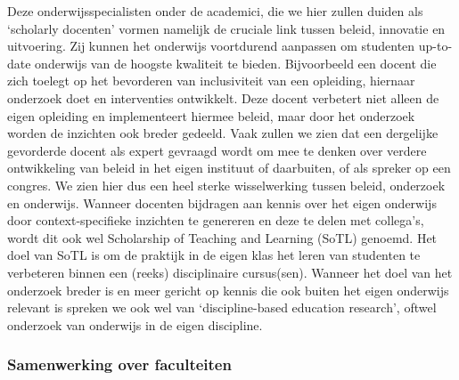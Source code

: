 \documentclass[empirical, authordate, ]{new-jote-article}
\begin{document}
	Deze onderwijsspecialisten onder de academici, die we hier zullen duiden als ‘scholarly docenten' vormen namelijk de cruciale link tussen beleid, innovatie en uitvoering. Zij kunnen het onderwijs voortdurend aanpassen om studenten up-to-date onderwijs van de hoogste kwaliteit te bieden. Bijvoorbeeld een docent die zich toelegt op het bevorderen van inclusiviteit van een opleiding, hiernaar onderzoek doet en interventies ontwikkelt. Deze docent verbetert niet alleen de eigen opleiding en implementeert hiermee beleid, maar door het onderzoek worden de inzichten ook breder gedeeld. Vaak zullen we zien dat een dergelijke gevorderde docent als expert gevraagd wordt om mee te denken over verdere ontwikkeling van beleid in het eigen instituut of daarbuiten, of als spreker op een congres. We zien hier dus een heel sterke wisselwerking tussen beleid, onderzoek en onderwijs. Wanneer docenten bijdragen aan kennis over het eigen onderwijs door context-specifieke inzichten te genereren en deze te delen met collega's, wordt dit ook wel Scholarship of Teaching and Learning (SoTL) genoemd. Het doel van SoTL is om de praktijk in de eigen klas het leren van studenten te verbeteren binnen een (reeks) disciplinaire cursus(sen). Wanneer het doel van het onderzoek breder is en meer gericht op kennis die ook buiten het eigen onderwijs relevant is spreken we ook wel van ‘discipline-based education research', oftwel onderzoek van onderwijs in de eigen discipline.



	\subsubsection{Samenwerking over faculteiten}
\end{document}
